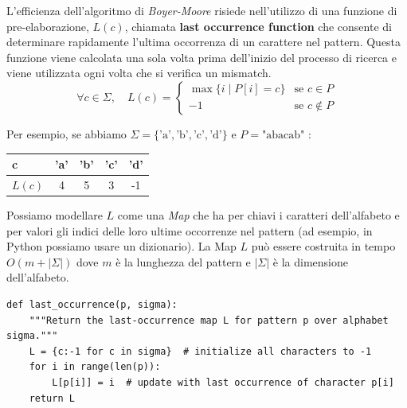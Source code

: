 L'efficienza dell'algoritmo di \emph{Boyer-Moore} risiede nell'utilizzo di una funzione di pre-elaborazione, $L(c)$, chiamata \textbf{last occurrence function} che consente di determinare rapidamente l'ultima occorrenza di un carattere nel pattern. Questa funzione viene calcolata una sola volta prima dell'inizio del processo di ricerca e viene utilizzata ogni volta che si verifica un mismatch.
$$
\forall c \in \Sigma, \quad L(c) = 
\begin{cases} 
   \max \{ i \mid P[i] = c \} & \text{se } c \in P \\
   -1 & \text{se } c \notin P 
\end{cases}
$$

\noindent
Per esempio, se abbiamo 
$\Sigma = \{ \text{'a'}, \text{'b'}, \text{'c'}, \text{'d'} \}$ 
e 
$P = \text{"abacab"}$
:
\begin{table}[h]
    \centering
    \setlength{\tabcolsep}{18pt} 
    \renewcommand{\arraystretch}{1.5}

    \begin{tabular}{|l|c|c|c|c|}
        \hline
        \textbf{c} & \textbf{'a'} & \textbf{'b'} & \textbf{'c'} & \textbf{'d'} \\
        \hline
        \textbf{$L(c)$} & 4 & 5 & 3 & -1 \\
        \hline
    \end{tabular}
\end{table}

\noindent
Possiamo modellare $L$ come una \emph{Map} che ha per chiavi i caratteri dell'alfabeto e per valori gli indici delle loro ultime occorrenze nel pattern (ad esempio, in Python possiamo usare un dizionario).
La Map $L$ può essere costruita in tempo $O(m + |\Sigma|)$ dove $m$ è la lunghezza del pattern e $|\Sigma|$ è la dimensione dell'alfabeto.

\vspace{1\baselineskip}
\begin{lstlisting}
def last_occurrence(p, sigma):
    """Return the last-occurrence map L for pattern p over alphabet sigma."""
    L = {c:-1 for c in sigma}  # initialize all characters to -1
    for i in range(len(p)):
        L[p[i]] = i  # update with last occurrence of character p[i]
    return L
\end{lstlisting}

